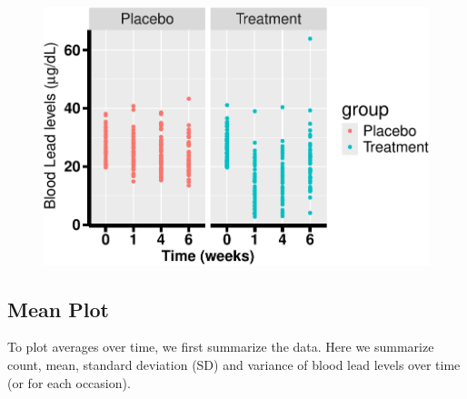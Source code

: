 \documentclass[
  letterpaper,
  DIV=11,
  numbers=noendperiod]{scrreprt}
\begin{document}
\begin{figure}[H]

{\centering \includegraphics{Longi_EDA_files/figure-pdf/unnamed-chunk-7-1.pdf}

}

\end{figure}

\hypertarget{mean-plot}{%
\subsection{Mean Plot}\label{mean-plot}}

To plot averages over time, we first summarize the data. Here we
summarize count, mean, standard deviation (SD) and variance of blood
lead levels over time (or for each occasion).
\end{document}
